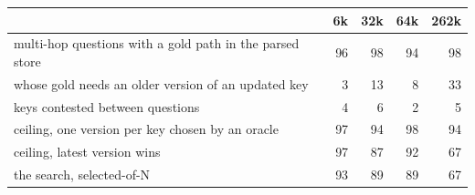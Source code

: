 \begin{tabular}{lrrrr}
\toprule
 & 6k & 32k & 64k & 262k \\
\midrule
multi-hop questions with a gold path in the parsed store & 96 & 98 & 94 & 98 \\
whose gold needs an older version of an updated key & 3 & 13 & 8 & 33 \\
keys contested between questions & 4 & 6 & 2 & 5 \\
ceiling, one version per key chosen by an oracle & 97 & 94 & 98 & 94 \\
ceiling, latest version wins & 97 & 87 & 92 & 67 \\
the search, selected-of-N & 93 & 89 & 89 & 67 \\
\bottomrule
\end{tabular}